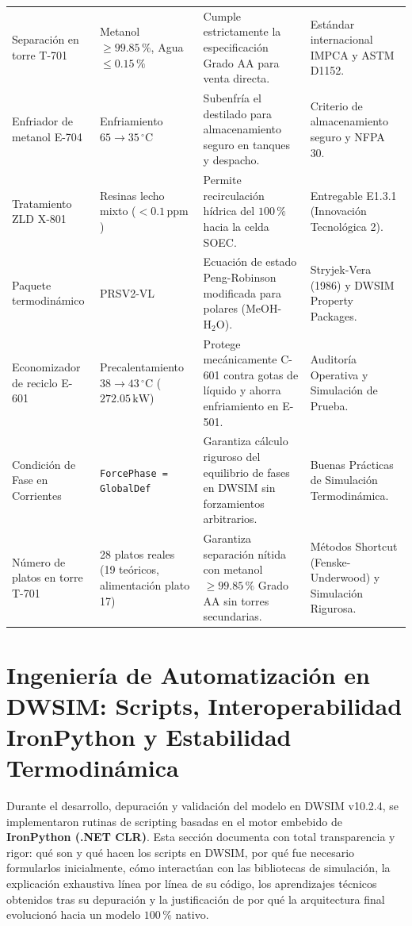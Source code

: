 \documentclass[11pt,a4paper]{article}
\begin{document}
\begin{longtable}{p{3.8cm} p{3.2cm} p{4.2cm} p{3.8cm}}
Separación en torre T-701 & Metanol $\ge 99.85\,\%$, Agua $\le 0.15\,\%$ & Cumple estrictamente la especificación Grado AA para venta directa. & Estándar internacional IMPCA y ASTM D1152. \\
Enfriador de metanol E-704 & Enfriamiento $65 \to 35\,^\circ\text{C}$ & Subenfría el destilado para almacenamiento seguro en tanques y despacho. & Criterio de almacenamiento seguro y NFPA 30. \\
Tratamiento ZLD X-801 & Resinas lecho mixto ($<0.1\,\text{ppm}$) & Permite recirculación hídrica del $100\,\%$ hacia la celda SOEC. & Entregable E1.3.1 (Innovación Tecnológica 2). \\
Paquete termodinámico & PRSV2-VL & Ecuación de estado Peng-Robinson modificada para polares ($\text{MeOH}$-$\text{H}_2\text{O}$). & Stryjek-Vera (1986) y DWSIM Property Packages. \\
Economizador de reciclo E-601 & Precalentamiento $38 \to 43\,^\circ\text{C}$ ($272.05\,\text{kW}$) & Protege mecánicamente C-601 contra gotas de líquido y ahorra enfriamiento en E-501. & Auditoría Operativa y Simulación de Prueba. \\
Condición de Fase en Corrientes & \texttt{ForcePhase = GlobalDef} & Garantiza cálculo riguroso del equilibrio de fases en DWSIM sin forzamientos arbitrarios. & Buenas Prácticas de Simulación Termodinámica. \\
Número de platos en torre T-701 & 28 platos reales (19 teóricos, alimentación plato 17) & Garantiza separación nítida con metanol $\ge 99.85\,\%$ Grado AA sin torres secundarias. & Métodos Shortcut (Fenske-Underwood) y Simulación Rigurosa. \\
\bottomrule
\end{longtable}

\section{Ingeniería de Automatización en DWSIM: Scripts, Interoperabilidad IronPython y Estabilidad Termodinámica}

Durante el desarrollo, depuración y validación del modelo en DWSIM v10.2.4, se implementaron rutinas de scripting basadas en el motor embebido de \textbf{IronPython (.NET CLR)}. Esta sección documenta con total transparencia y rigor: qué son y qué hacen los scripts en DWSIM, por qué fue necesario formularlos inicialmente, cómo interactúan con las bibliotecas de simulación, la explicación exhaustiva línea por línea de su código, los aprendizajes técnicos obtenidos tras su depuración y la justificación de por qué la arquitectura final evolucionó hacia un modelo $100\,\%$ nativo.
\end{document}
